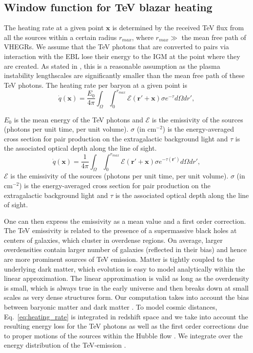\documentclass[onecolumn]{emulateapj}
\begin{document}
\subsection{Window function for TeV blazar heating}
The heating rate at a given point $\mathbf{x}$ is determined by the received TeV flux from all the sources within a certain radius $r_{max}$, where $r_{max} \gg $ the mean free path of VHEGRs. We assume that the TeV photons that are converted to pairs via interaction with the EBL lose their energy to the IGM at the point where they are created.  As stated in \citet{2012ApJ...752...22B}, this is a reasonable assumption as the plasma instability lengthscales are significantly smaller than the mean free path of these TeV photons. The heating rate per baryon at a given point is 
\begin{equation}
\label{eq:heating_rate}
  \dot{q}(\mathbf{x})= \frac{E_0}{4\pi}  \int_{\Omega}\int_0^{r_{max}}   \mathcal{E}(\mathbf{r}'+\mathbf{x})\sigma  e^{-\tau}d\Omega dr' ,
\end{equation}

 $E_0$ is the mean energy of the TeV photons and   $\mathcal{E}$ is the emissivity of the sources (photons per unit time, per unit volume). $\sigma$ (in cm$^{-2}$) is the energy-averaged cross section for pair production on the extragalactic background light and $\tau$ is the associated optical depth along the line of sight. 
\begin{equation}
\label{eq:heating_rate}
  \dot{q}(\mathbf{x})= \frac{1} {4\pi}  \int_{\Omega}\int_0^{r_{max}}   \mathcal{E}(\mathbf{r}'+\mathbf{x})\sigma  e^{-\tau(\mathbf{r}')}d\Omega dr' ,
\end{equation}
$\mathcal{E}$ is the emissivity of the sources (photons per unit time, per unit volume). $\sigma$ (in cm$^{-2}$) is the energy-averaged cross section for pair production on the extragalactic background light and $\tau$ is the associated optical depth along the line of sight. 

 
 
One can then express the emissivity as a mean value and a first order correction. The TeV emissivity is related to the presence of a supermassive black holes at centers of galaxies, which cluster in overdense regions. On average, larger overdensities contain larger number of galaxies (reflected in their bias) and hence are more prominent sources of TeV emission.  Matter is tightly coupled to the underlying dark matter, which evolution is easy to model analytically within the linear approximation.  The linear approximation is valid as long as the overdensity is small, which is always true in the early universe and then breaks down at small scales as very dense structures form.  Our computation takes into account the bias between baryonic matter and dark matter \citep{1996MNRAS.282..347M}. To model cosmic distances, Eq.~\ref{eq:heating_rate} is integrated in redshift space and we take into account the resulting energy loss for the TeV photons as well as the first order corrections due to proper motions of the sources within the Hubble flow \citep{1987MNRAS.227....1K}. We integrate over the energy distribution of the TeV-emission . 
\end{document}
